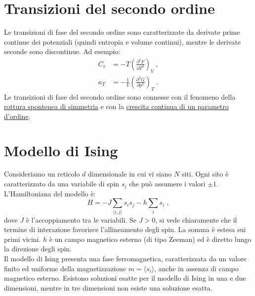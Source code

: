 \documentclass[10pt,a4paper]{report}
\theoremstyle{definition}
\newcommand{\pdev}[3][]{\frac{\partial^{#1} #2}{\partial #3^{#1}}}
\numberwithin{equation}{section}
\newcommand{\bra}{\langle}
\newcommand{\ket}{\rangle}
\begin{document}
\section{Transizioni del secondo ordine}
Le transizioni di fase del secondo ordine sono caratterizzate da derivate prime continue dei potenziali (quindi entropia e volume continui), mentre le derivate seconde sono discontinue. Ad esempio:
\begin{align*}
C_v&=-T\left(\pdev[2]{F}{T}\right)_V\;, \\
\kappa_T&=-\frac{1}{V}\left(\pdev[2]{G}{p}\right)_T\;.
\end{align*}
Le transizioni di fase del secondo ordine sono connesse con il fenomeno della \underline{rottura spontenea di simmetria} e con la \underline{crescita continua di un parametro d'ordine}.
\section{Modello di Ising}
Consideriamo un reticolo $d$ dimensionale in cui vi siano $N$ siti. Ogni sito è caratterizzato da una variabile di spin $s_i$ che può assumere i valori $\pm 1$. L'Hamiltoniana del modello è:
\begin{equation}
H=-J\sum_{\bra i,j\ket}s_is_j-h\sum_is_i\;,
\end{equation}
dove $J$ è l'accoppiamento tra le variabili. Se $J>0$, si vede chiaramente che il termine di interazione favorisce l'allineamento degli spin. La somma è estesa sui primi vicini. $h$ è un campo magnetico esterno  (di tipo Zeeman) ed è diretto lungo la direzione degli spin. \\
Il modello di Ising presenta una fase ferromagnetica, caratterizzata da un valore finito ed uniforme della magnetizzazione $m=\bra s_i\ket$, anche in assenza di campo magnetico esterno. Esistono soluzioni esatte per il modello di Ising in una e due dimensioni, mentre in tre dimensioni non esiste una soluzione esatta.
\end{document}
